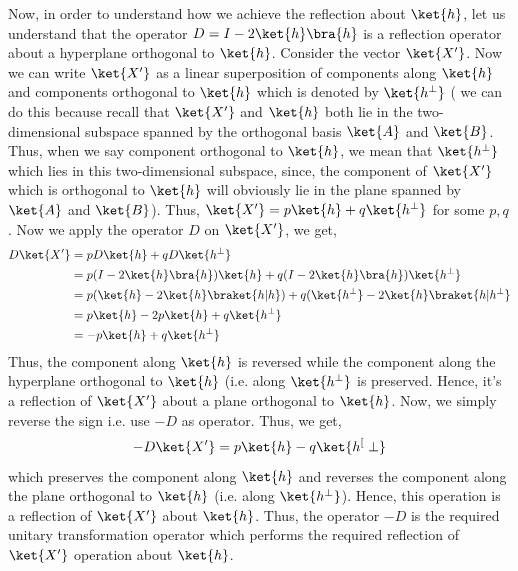 \documentclass[12pt, oneside]{book}
\theoremstyle{definition}
\theoremstyle{definition}
\theoremstyle{remark}
\begin{document}
Now, in order to understand how we achieve the reflection about $\ket{h}$, let us understand that the operator $D=I-2\ket{h}\bra{h}$ is a reflection operator about a hyperplane orthogonal to $\ket{h}$. Consider the vector $\ket{X'}$. Now we can write $\ket{X'}$ as a linear superposition of components along $\ket{h}$ and components orthogonal to $\ket{h}$ which is denoted by $\ket{h^{\perp}}$ ( we can do this because recall that $\ket{X'}$ and $\ket{h}$ both lie in the two-dimensional subspace spanned by the orthogonal basis $\ket{A}$ and $\ket{B}$. Thus, when we say component orthogonal to $\ket{h}$, we mean that $\ket{h^{\perp}}$ which lies in this two-dimensional subspace, since, the component of $\ket{X'}$ which is orthogonal to $\ket{h}$ will obviously lie in the plane spanned by $\ket{A}$ and $\ket{B}$). Thus, $\ket{X'}=p\ket{h}+q\ket{h^{\perp}}$ for some $p,q$. Now we apply the operator $D$ on $\ket{X'}$, we get,
\begin{align*}
D\ket{X'}&=pD\ket{h}+qD\ket{h^{\perp}}\\
&=p(I-2\ket{h}\bra{h})\ket{h}+q(I-2\ket{h}\bra{h})\ket{h^{\perp}}\\
&=p(\ket{h}-2\ket{h}\braket{h|h})+q(\ket{h^{\perp}}-2\ket{h}\braket{h|h^{\perp}}\\
&=p\ket{h}-2p\ket{h}+q\ket{h^{\perp}}\\
&=-p\ket{h}+q\ket{h^{\perp}}\\
\end{align*}
Thus, the component along $\ket{h}$ is reversed while the component along the hyperplane orthogonal to $\ket{h}$ (i.e. along $\ket{h^{\perp}}$ is preserved. Hence, it's a reflection of $\ket{X'}$ about a plane orthogonal to $\ket{h}$. Now, we simply reverse the sign i.e. use $-D$ as operator. Thus, we get,
\[
-D\ket{X'}=p\ket{h}-q\ket{h^[\perp}
\]
which preserves the component along $\ket{h}$ and reverses the component along the plane orthogonal to $\ket{h}$ (i.e. along $\ket{h^{\perp}}$). Hence, this operation is a reflection of $\ket{X'}$ about $\ket{h}$. Thus, the operator $-D$ is the required unitary transformation operator which performs the required reflection of $\ket{X'}$ operation about $\ket{h}$.
\end{document}
